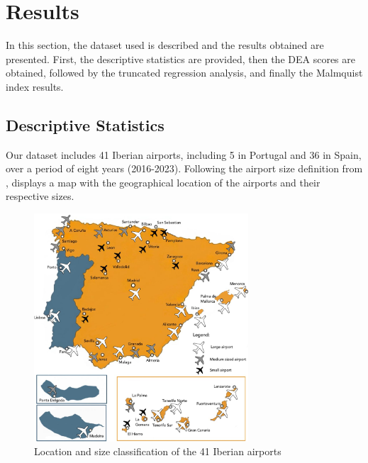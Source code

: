 
\section{Results}
\label{sec:resul}
In this section, the dataset used is described and the results obtained are presented. First, the descriptive statistics are provided, then the DEA scores are obtained, followed by the truncated regression analysis, and finally the Malmquist index results.
\subsection{Descriptive Statistics}
\label{subsec:resul_data}
Our dataset includes 41 Iberian airports, including 5 in Portugal and 36 in Spain, over a period of eight years (2016-2023). Following the airport size definition from \cite{ripoll-zarraga2020},  displays a map with the geographical location of the airports and their respective sizes.  

\vspace{-0.25cm}
\begin{figure}[h!]
  \centering
  \includegraphics[width=8cm]{images/mapa.jpg}
  \vspace{-0.5cm}
  \caption{Location and size classification of the 41 Iberian airports}
  \label{fig:mapa}
\end{figure}

